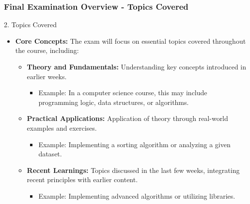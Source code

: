 \documentclass[aspectratio=169]{beamer}
\begin{document}
\begin{frame}[fragile]
    \frametitle{Final Examination Overview - Topics Covered}
    \begin{block}{2. Topics Covered}
        \begin{itemize}
            \item \textbf{Core Concepts:} The exam will focus on essential topics covered throughout the course, including:
            \begin{itemize}
                \item \textbf{Theory and Fundamentals:} Understanding key concepts introduced in earlier weeks.
                \begin{itemize}
                    \item Example: In a computer science course, this may include programming logic, data structures, or algorithms.
                \end{itemize}
                \item \textbf{Practical Applications:} Application of theory through real-world examples and exercises.
                \begin{itemize}
                    \item Example: Implementing a sorting algorithm or analyzing a given dataset.
                \end{itemize}
                \item \textbf{Recent Learnings:} Topics discussed in the last few weeks, integrating recent principles with earlier content.
                \begin{itemize}
                    \item Example: Implementing advanced algorithms or utilizing libraries.
                \end{itemize}
            \end{itemize}
        \end{itemize}
    \end{block}
\end{frame}
\end{document}
